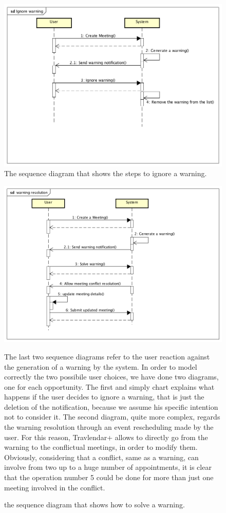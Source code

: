 \begin{figure}
	\centering
	\includegraphics[width=0.7\linewidth]{sequencediagrams/Ignorewarning}
	\caption{The sequence diagram that shows the steps to ignore a warning.}
	\label{fig:ignorewarning}
\end{figure}

\begin{figure}
	\centering
	\includegraphics[width=0.7\linewidth]{"sequencediagrams/ warningresolution"}
	\caption{the sequence diagram that shows how to solve a warning.}
	\label{fig:-warningresolution}
	\begin{center}
		The last two sequence diagrams refer to the user reaction against the generation of a warning by the system. 
		In order to model correctly the two possibile user choices, we have done two diagrams, one for each opportunity. 
		The first and simply chart explains what happens if the user decides to ignore a warning, that is just the deletion of the notification, because we assume his specific intention not to consider it. 
		The second diagram, quite more complex, regards the warning resolution through an event rescheduling made by the user. For this reason, Travlendar+ allows to directly go from the warning to the conflictual meetings, in order to modify them. 
		Obviously, considering that a conflict, same as a warning, can involve from two up to a huge number of appointments, it is clear that the operation number 5 could be done for more than just one meeting involved in the conflict. 
	\end{center}
\end{figure}



